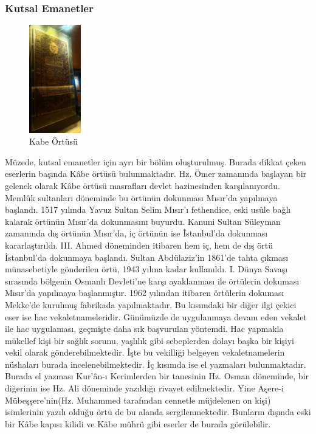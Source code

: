 \subsubsection{Kutsal Emanetler}
\begin{figure}
    \centering
    \includegraphics[width=0.20\textwidth]{assets/kabe.jpg}
    \caption{Kabe Örtüsü}
    \label{fig:kabe}
\end{figure}
\indent\indent Müzede, kutsal emanetler için ayrı bir bölüm oluşturulmuş. Burada dikkat çeken eserlerin başında Kâbe örtüsü bulunmaktadır. Hz. Ömer zamanında başlayan bir gelenek olarak Kâbe örtüsü masrafları devlet hazinesinden karşılanıyordu. Memlûk sultanları döneminde bu örtünün dokunması Mısır'da yapılmaya başlandı. 1517 yılında Yavuz Sultan Selim Mısır'ı fethendice, eski usûle bağlı kalarak örtünün Mısır'da dokunmasını buyurdu. Kanuni Sultan Süleyman zamanında dış örtünün Mısır'da, iç örtünün ise İstanbul'da dokunması kararlaştırıldı. III. Ahmed döneminden itibaren hem iç, hem de dış örtü İstanbul'da dokunmaya başlandı. Sultan Abdülaziz'in 1861'de tahta çıkması münasebetiyle gönderilen örtü, 1943 yılına kadar kullanıldı. I. Dünya Savaşı sırasında bölgenin Osmanlı Devleti'ne karşı ayaklanması ile örtülerin dokuması Mısır'da yapılmaya başlanmıştır. 1962 yılından itibaren örtülerin dokuması Mekke'de kurulmuş fabrikada yapılmaktadır.\cite{dia_4}\newline
\indent Bu kısımdaki bir diğer ilgi çekici eser ise hac vekaletnameleridir. Günümüzde de uygulanmaya devam eden vekalet ile hac uygulaması, geçmişte daha sık başvurulan yöntemdi. Hac yapmakla mükellef kişi bir sağlık sorunu, yaşlılık gibi sebeplerden dolayı başka bir kişiyi vekil olarak gönderebilmektedir. İşte bu vekilliği belgeyen vekaletnamelerin nüshaları burada incelenebilmektedir.\newline
\indent İç kısımda ise el yazmaları bulunmaktadır. Burada el yazması Kur'ân-ı Kerimlerden bir tanesinin Hz. Osman döneminde, bir diğerinin ise Hz. Ali döneminde yazıldığı rivayet edilmektedir. Yine Aşere-i Mübeşşere'nin(Hz. Muhammed tarafından cennetle müjdelenen on kişi) isimlerinin yazılı olduğu örtü de bu alanda sergilenmektedir. Bunların dışında eski bir Kâbe kapısı kilidi ve Kâbe mührü gibi eserler de burada görülebilir.
